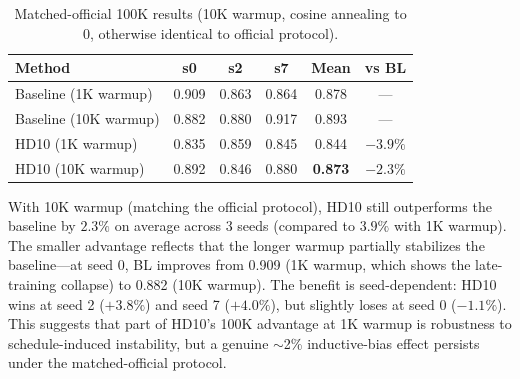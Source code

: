 \documentclass{article}
\begin{document}
\begin{table}[h]
\centering
\caption{Matched-official 100K results (10K warmup, cosine annealing to 0, otherwise identical to official protocol).}
\label{tab:matched_official}
\small
\begin{tabular}{lccccc}
\toprule
\textbf{Method} & \textbf{s0} & \textbf{s2} & \textbf{s7} & \textbf{Mean} & \textbf{vs BL} \\
\midrule
Baseline (1K warmup) & 0.909 & 0.863 & 0.864 & 0.878 & --- \\
Baseline (10K warmup) & 0.882 & 0.880 & 0.917 & 0.893 & --- \\
\midrule
HD10 (1K warmup) & 0.835 & 0.859 & 0.845 & 0.844 & $-3.9\%$ \\
HD10 (10K warmup) & 0.892 & 0.846 & 0.880 & \textbf{0.873} & $\mathbf{-2.3\%}$ \\
\bottomrule
\end{tabular}
\end{table}

With 10K warmup (matching the official protocol), HD10 still outperforms the baseline by $2.3\%$ on average across 3 seeds (compared to $3.9\%$ with 1K warmup). The smaller advantage reflects that the longer warmup partially stabilizes the baseline---at seed 0, BL improves from 0.909 (1K warmup, which shows the late-training collapse) to 0.882 (10K warmup). The benefit is seed-dependent: HD10 wins at seed 2 ($+3.8\%$) and seed 7 ($+4.0\%$), but slightly loses at seed 0 ($-1.1\%$). This suggests that part of HD10's 100K advantage at 1K warmup is robustness to schedule-induced instability, but a genuine $\sim$2\% inductive-bias effect persists under the matched-official protocol.
\end{document}
